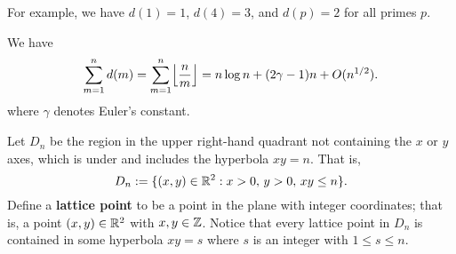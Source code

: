 For example, we have $d(1) = 1$, $d(4) = 3$, and $d(p) = 2$ for all primes $p$. 

\begin{thm}\label{thm:3.9}
We have 
\[ \sum_{m=1}^n d(m) = \sum_{m=1}^n \floor*{\frac nm} = n\log n + (2\gamma - 1)n + O(n^{1/2}). \]
where $\gamma$ denotes Euler's constant. 
\end{thm}
\begin{pf}
Let $D_n$ be the region in the upper right-hand quadrant not containing the $x$ or $y$ axes, 
which is under and includes the hyperbola $xy = n$. That is, 
\[ D_n := \{(x, y) \in \mathbb{R}^2 : x > 0,\, y > 0,\, xy \leq n\}. \]
Define a {\bf lattice point} to be a point in the plane with integer coordinates; that is, a point 
$(x, y) \in \mathbb{R}^2$ with $x, y \in \mathbb{Z}$. Notice that every lattice point in $D_n$ is contained in 
some hyperbola $xy = s$ where $s$ is an integer with $1 \leq s \leq n$. 


\end{pf}
